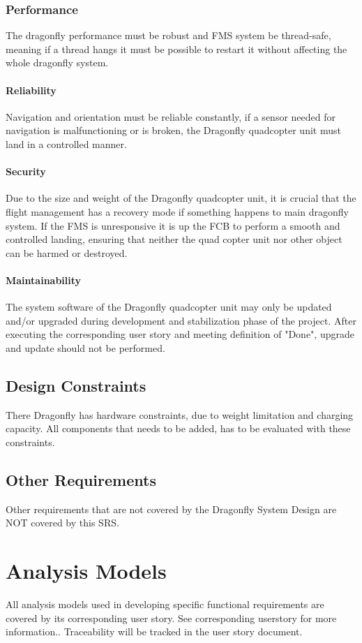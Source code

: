\documentclass[a4paper]{article}
\begin{document}
\subsubsection{Performance}
The dragonfly performance must be robust and FMS system be thread-safe, meaning if a thread hangs it must be possible to restart it without affecting the whole dragonfly system. 
\paragraph{Reliability}
Navigation and orientation must be reliable constantly, if a sensor needed for navigation is malfunctioning or is broken, the Dragonfly quadcopter unit must land in a controlled manner. 
\paragraph{Security}
Due to the size and weight of the Dragonfly quadcopter unit, it is crucial that the flight management has a recovery mode if something happens to main dragonfly system. If the FMS is unresponsive it is up the FCB to perform a smooth and controlled landing, ensuring that neither the quad copter unit nor other object can be harmed or destroyed.  
\paragraph{Maintainability}
The system software of the Dragonfly quadcopter unit may only be updated and/or upgraded during development and stabilization phase of the project. After executing the corresponding user story and meeting definition of "Done", upgrade and update should not be performed. 

\subsection{Design Constraints}
There Dragonfly has hardware constraints, due to weight limitation and charging capacity. All components that needs to be added, has to be evaluated with these constraints.

\subsection{Other Requirements}
Other requirements that are not covered by the Dragonfly System Design are NOT covered by this SRS.

\section{Analysis Models}
All analysis models used in developing specific functional requirements are covered by its corresponding user story.  See corresponding userstory for more information.. Traceability will be tracked in the user story document.
\end{document}
